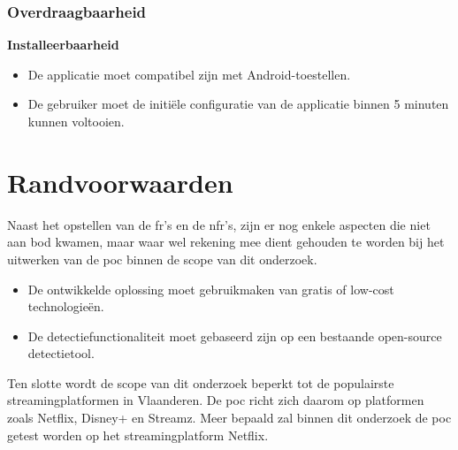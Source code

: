 \vspace{1em}

\subsubsection{Overdraagbaarheid}
\vspace{1em}

\hspace*{1.5em}\textbf{Installeerbaarheid}

\begin{itemize}
    \item De applicatie moet compatibel zijn met Android-toestellen.
    \item De gebruiker moet de initiële configuratie van de applicatie binnen 5 minuten kunnen voltooien.
\end{itemize}

\vspace{1em}

\section{Randvoorwaarden}

\vspace{1em}

Naast het opstellen van de \acrshort{fr}'s en de \acrshort{nfr}'s, zijn er nog enkele aspecten die niet aan bod kwamen, maar waar wel rekening mee dient gehouden te worden bij het uitwerken van de \acrshort{poc} binnen de scope van dit onderzoek.

\begin{itemize}
    \item De ontwikkelde oplossing moet gebruikmaken van gratis of low-cost technologieën.
    
    \item De detectiefunctionaliteit moet gebaseerd zijn op een bestaande open-source detectietool.
\end{itemize}

Ten slotte wordt de scope van dit onderzoek beperkt tot de populairste streamingplatformen in Vlaanderen. De \acrshort{poc} richt zich daarom op platformen zoals Netflix, Disney+ en Streamz. Meer bepaald zal binnen dit onderzoek de \acrshort{poc} getest worden op het streamingplatform Netflix.